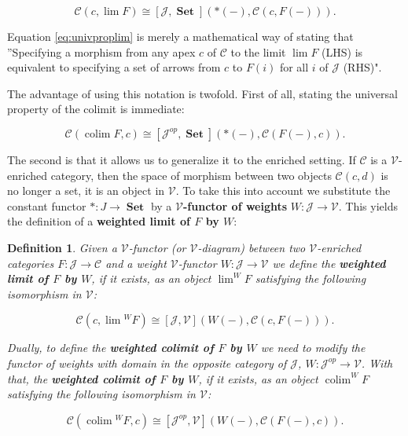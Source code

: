 \documentclass[10pt,a4paper]{elsarticle}
\newcommand{\C}{\mathcal{C}}
\newcommand{\J}{\mathcal{J}}
\newcommand{\V}{\mathcal{V}}
\newcommand{\colim}{\operatorname{colim}}
\newcommand{\Set}{\operatorname{\textbf{Set}}}
\newtheorem{definition}[theorem]{Definition}
\begin{document}
{	\begin{equation}\label{eq:univproplim}
		\C(c,\lim F)\cong [\J, \Set](*(-),\C(c,F(-))).
	\end{equation}
	
	Equation \eqref{eq:univproplim} is merely a mathematical way of stating that ''Specifying a morphism from any apex $c$ of $\C$ to the limit $\lim F$ (LHS) is equivalent to specifying a set of arrows from $c$ to $F(i)$ for all $i$ of $\J$ (RHS)".
	
	The advantage of using this notation is twofold. First of all, stating the universal property of the colimit is immediate:
	
	
	\begin{equation}\label{eq:univpropcolim}
		\C(\colim F,c)\cong [\J^{op}, \Set](*(-),\C(F(-),c)).
	\end{equation}
	
	The second is that it allows us to generalize it to the enriched setting. If $\C$ is a $\V$-enriched category, then the space of morphism between two objects $\C(c,d)$ is no longer a set, it is an object in $\V$. To take this into account we substitute the constant functor $*\colon J\to \Set$ by a \textbf{$\V$-functor of weights} $W\colon\J\to\V$. This yields the definition of a \textbf{weighted limit of $F$ by $W$}:
	
	\begin{definition}\label{def:ecolim}
		Given a $\V$-functor (or $\V$-diagram) between two $\V$-enriched categories $F\colon\J\to\C$ and a weight $\V$-functor $W\colon\J\to\V$ we define the \textbf{weighted limit of $F$ by $W$}, if it exists, as an object $\lim^{W}F$ satisfying the following isomorphism in $\V$:
		
		
		\begin{equation}\label{eq:eunivproplim}
			\C(c,{\lim {}^{W}} F)\cong [\J, \V](W(-),\C(c,F(-))).
		\end{equation}
		
		Dually, to define the \textbf{weighted colimit of $F$ by $W$} we need to modify the functor of weights with domain in the opposite category of $\J$, $W\colon\J^{op}\to\V$. With that, the \textbf{weighted colimit of $F$ by $W$}, if it exists, as an object $\colim^{W}F$ satisfying the following isomorphism in $\V$:
		
		\begin{equation}\label{eq:eunivpropcolim}
			\C({\colim {}^{W}} F,c)\cong [\J^{op}, \V](W(-),\C(F(-),c)).
		\end{equation}
		

\end{definition}}
\end{document}
